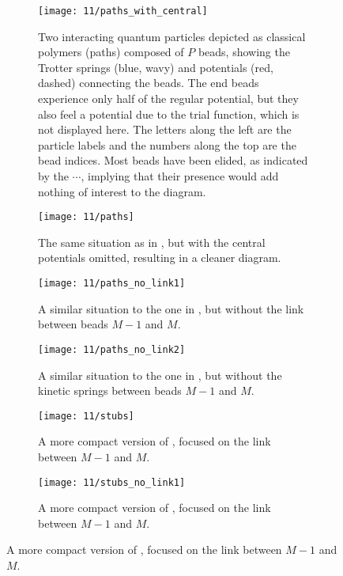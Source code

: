 \begin{figure}
	\setlength{\figspacing}{10 mm}
	\centering
	\begin{subfigure}[b]{\textwidth}
		\texttt{[image: 11/paths\_with\_central]}
		\caption{
			Two interacting quantum particles depicted as classical polymers (paths) composed of $P$ beads, showing the Trotter springs (blue, wavy) and potentials (red, dashed) connecting the beads.
			The end beads experience only half of the regular potential, but they also feel a potential due to the trial function, which is not displayed here.
			The letters along the left are the particle labels and the numbers along the top are the bead indices.
			Most beads have been elided, as indicated by the $\cdots$, implying that their presence would add nothing of interest to the diagram.
		}
		\label{fig:paths-with-central}
		\vspace{\figspacing}
	\end{subfigure}
	\begin{subfigure}[b]{\textwidth}
		\texttt{[image: 11/paths]}
		\caption{
			The same situation as in , but with the central potentials omitted, resulting in a cleaner diagram.
		}
		\label{fig:paths}
		\vspace{\figspacing}
	\end{subfigure}
	\begin{subfigure}[b]{\textwidth}
		\texttt{[image: 11/paths\_no\_link1]}
		\caption{
			A similar situation to the one in , but without the link between beads $M-1$ and $M$.
		}
		\label{fig:paths-no-link1}
		\vspace{\figspacing}
	\end{subfigure}
	\begin{subfigure}[b]{\textwidth}
		\texttt{[image: 11/paths\_no\_link2]}
		\caption{
			A similar situation to the one in , but without the kinetic springs between beads $M-1$ and $M$.
		}
		\label{fig:paths-no-link2}
		\vspace{\figspacing}
	\end{subfigure}
	\mbox{}
	\hfill
	\begin{subfigure}[b]{0.4\textwidth}
		\centering
		\texttt{[image: 11/stubs]}
		\caption{
			A more compact version of , focused on the link between $M-1$ and $M$.
		}
		\label{fig:stubs}
	\end{subfigure}
	\hfill
	\begin{subfigure}[b]{0.4\textwidth}
		\centering
		\texttt{[image: 11/stubs\_no\_link1]}
		\caption{
			A more compact version of , focused on the link between $M-1$ and $M$.
		}
		\label{fig:stubs-no-link1}
	\end{subfigure}
	\hfill
	\mbox{}
	\vspace{\figspacing}


\end{figure}
